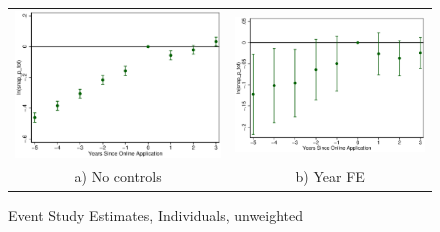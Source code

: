 \documentclass[11pt,letterpaper]{article}
\begin{document}
\begin{figure}\caption{Event Study Estimates, Individuals, unweighted}
\begin{tabular}{cc}
\includegraphics[scale=0.57]{tabfig/evstu_snap_p_tot_one_notr_5_3}&\includegraphics[scale=0.57]{tabfig/evstu_snap_p_tot_one_year_5_3}\\
a) No controls&b) Year FE\\

\end{tabular}
\end{figure}
\end{document}
